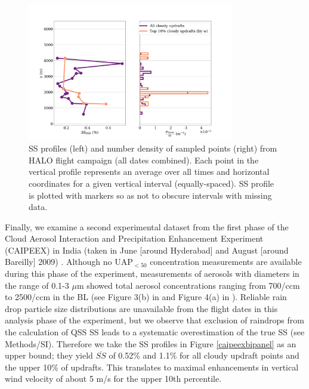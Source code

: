 \documentclass{article}
\begin{document}

\begin{figure}[ht]
    \centering
    \includegraphics[width=9cm]{revhalo/v1_FINAL_combined_bipanel_ss_qss_vs_z_figure.png}
    \caption{SS profiles (left) and number density of sampled points (right) from HALO flight campaign (all dates combined). Each point in the vertical profile represents an average over all times and horizontal coordinates for a given vertical interval (equally-spaced). SS profile is plotted with markers so as not to obscure intervals with missing data.}
    \label{halobipanel}
\end{figure}

Finally, we examine a second experimental dataset from the first phase of the Cloud Aerosol Interaction and Precipitation Enhancement Experiment (CAIPEEX) in India (taken in June [around Hyderabad] and August [around Bareilly] 2009) \cite{Kulkarni2012}. Although no UAP$_{<50}$ concentration measurements are available during this phase of the experiment, measurements of aerosols with diameters in the range of 0.1-3 $\mu$m showed total aerosol concentrations ranging from 700/ccm to 2500/ccm in the BL (see Figure 3(b) in \cite{Prabha2011} and Figure 4(a) in \cite{Kulkarni2012}). Reliable rain drop particle size distributions are unavailable from the flight dates in this analysis phase of the experiment, but we observe that exclusion of raindrops from the calculation of QSS SS leads to a systematic overestimation of the true SS (see Methods/SI). Therefore we take the SS profiles in Figure \ref{caipeexbipanel} as an upper bound; they yield $\overline{SS}$ of 0.52\% and 1.1\% for all cloudy updraft points and the upper 10\% of updrafts. This translates to maximal enhancements in vertical wind velocity of about 5 m/s for the upper 10th percentile.
\end{document}
